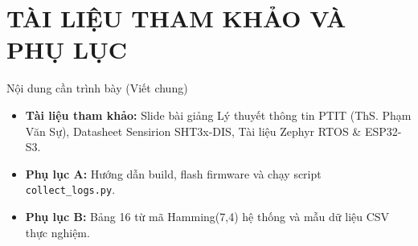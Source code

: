 \documentclass[12pt,a4paper]{report}
\begin{document}
\chapter*{TÀI LIỆU THAM KHẢO VÀ PHỤ LỤC}

\begin{notebox}{Nội dung cần trình bày (Viết chung)}
\begin{itemize}[leftmargin=*,nosep]
    \item \textbf{Tài liệu tham khảo:} Slide bài giảng Lý thuyết thông tin PTIT (ThS. Phạm Văn Sự), Datasheet Sensirion SHT3x-DIS, Tài liệu Zephyr RTOS \& ESP32-S3.
    \item \textbf{Phụ lục A:} Hướng dẫn build, flash firmware và chạy script \texttt{collect\_logs.py}.
    \item \textbf{Phụ lục B:} Bảng 16 từ mã Hamming(7,4) hệ thống và mẫu dữ liệu CSV thực nghiệm.
\end{itemize}
\end{notebox}
\end{document}
